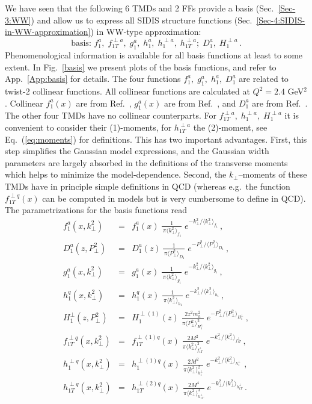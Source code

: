 \documentclass[a4paper,11pt]{article}
\newcommand{\be}{\begin{equation}}
\newcommand{\ee}{\end{equation}}
\newcommand{\ba}{\begin{eqnarray}}
\newcommand{\ea}{\end{eqnarray}}
\newcommand{\la}{\langle}
\newcommand{\ra}{\rangle}
\def\kperp{k_\perp}
\def\pperp{P_\perp}
\def\avkperp{\la \kperp^2 \ra}
\def\avpperp{\la \pperp^2 \ra}
\begin{document}
We have seen that the following 6 TMDs and 2 FFs provide a basis 
(Sec.~\ref{Sec-3:WW}) and allow us to express all SIDIS structure 
functions (Sec.~\ref{Sec-4:SIDIS-in-WW-approximation})  
in WW-type approximation: 
\be\label{Eq:basis}
   \mbox{basis: \ \ } 
   f_1^a, \; f_{1T}^{\perp a}, \; g_1^a, \; h_1^a, \;h_1^{\perp a},\; h_{1T}^{\perp a};
   \; D_1^a, \; H_1^{\perp a} \, .
\ee
Phenomenological information is available for all basis functions at 
least to some extent. 
In Fig.~\ref{basis} we present plots of the basis functions, and refer
to App.~\ref{App:basis} for details.
The four functions $f_1^a, \; g_1^a, \; h_1^a,\; D_1^a$  are related to 
twist-2 collinear functions. All collinear functions are calculated at 
$Q^2 = 2.4$ GeV$^2$. Collinear $f_1^a(x)$ are from Ref.~\cite{Martin:2009iq},  
$g_1^a(x)$ are from Ref.~\cite{Gluck:1998xa}, and $D_1^a$ are from 
Ref.~\cite{deFlorian:2007aj}. The other four TMDs 
have no collinear counterparts. 
For $f_{1T}^{\perp a},\;h_1^{\perp a},\;H_1^{\perp a}$ it is convenient to 
consider their (1)-moments, for $ h_{1T}^{\perp a}$  the (2)-moment,
see Eq.~(\ref{eq:moments}) for definitions.
This has two important advantages. First, this step simplifies 
the Gaussian model expressions, and the Gaussian width parameters are
largely absorbed in the definitions of the transverse moments which 
helps to minimize the model-dependence. Second,
the $k_\perp$--moments of these TMDs have in principle simple definitions
in QCD (whereas e.g.\ the function $f_{1T}^{\perp q}(x)$ can be computed in
models but is very cumbersome to define in QCD).
The parametrizations for the basis functions read
\begin{subequations}\ba
	f^a_1(x,\kperp^2) &=& f^a_1(x)\;
    	\frac{1}{\,\pi\avkperp_{f_1}}\;e^{-\kperp^2/\avkperp_{f_1}} \, ,
	\label{Eq:Gauss-f1}\\
    	D^a_1(z,\pperp^2) &=& D_1^a(z)\,
    	\frac{1}{\,\pi\avpperp_{D_1}}\;e^{-\pperp^2/\avpperp_{D_1}} \, ,
	\label{Eq:Gauss-D1}\\
	g^a_1(x,\kperp^2) &=& g^a_1(x)\;
    	\frac{1}{\,\pi\avkperp_{g_1}}\;e^{-\kperp^2/\avkperp_{g_1}} \, ,
	\label{Eq:Gauss-g1}\\
	h_{1}^{q} (x, \kperp^2) &=& h_{1}^{q} (x)\;
  	\frac{1}{\,\pi \avkperp_{h_1}}\;e^{-{\kperp^2}/{\avkperp_{h_1} }} \, ,
	\label{Eq:Gauss-h1}\\
	H_{1}^{\perp}(z,\pperp^2) &=&  H_{1}^{\perp (1)}(z) \;  
	\frac{2 z^2 m_h^2}{\pi \avpperp_{H_{1}^\perp}^2} \;
	e^{-\pperp^2/{\avpperp_{H_{1}^\perp}}}\, ,\\
	f_{1T}^{\perp q}(x,\kperp^2) &=&  f_{1T}^{\perp (1) q}(x)   \;
	\frac{2 M^2}{\pi \avkperp_{f_{1T}^\perp}^2} \;
	e^{-\kperp^2/{\avkperp_{f_{1T}^\perp}}} 
	\label{Eq:Gauss-f1Tperp}\, ,\\
	h_{1}^{\perp q}(x,\kperp^2) &=&  h_{1}^{\perp (1) q}(x)\;
   	\frac{2 M^2}{\pi \avkperp_{h_{1}^\perp}^2}\;
 	e^{-\kperp^2/{\avkperp_{h_{1}^\perp}}}\,
	\label{Eq:Gauss-h1perp}\, ,\\
	h_{1T}^{\perp q}(x,\kperp^2) &=&  h_{1T}^{\perp (2) q}(x)\;
   	\frac{2 M^4}{\pi \avkperp_{h_{1T}^\perp}^3} \;
	e^{-\kperp^2/{\avkperp_{h_{1T}^\perp}}}
	\label{Eq:Gauss-h1Tperp}\, .
\ea\end{subequations}
\end{document}
